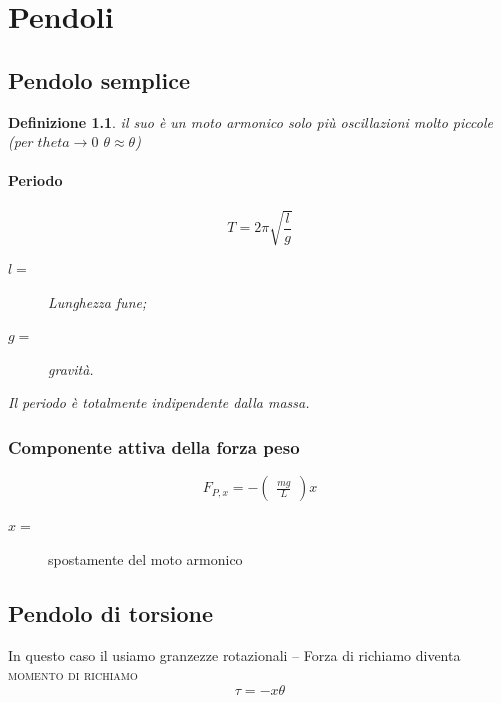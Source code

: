 \documentclass{book}
\newtheorem{defi}{Definizione}[section]
\begin{document}
\chapter{Pendoli}
\label{chap:pendoli}

\section{Pendolo semplice}
\label{sec:pensem}

\begin{defi}
  il suo è un moto armonico solo più oscillazioni molto piccole (per $theta\to 0$ $\theta\approx\theta$)
  \subsubsection{Periodo}
  \label{sec:perpensem}
  \begin{equation}
    \label{eq:pensem}
    T=2\pi\sqrt{\frac{l}{g}}
  \end{equation}
  \begin{description}
  \item[$l=$] Lunghezza fune;
  \item[$g=$] gravità.
  \end{description}
  Il periodo è totalmente indipendente dalla massa.
\end{defi}

\subsection{Componente attiva della forza peso}
\label{sec:componenteattdelforzapeso}

\begin{equation}
  \label{eq:componenteattdelforzapeso}
  F_{P,x}=-
  \begin{pmatrix}
    \frac{mg}{L}
  \end{pmatrix}x
\end{equation}
\begin{description}
\item[$x=$] spostamente del moto armonico
\end{description}
\section{Pendolo di torsione}
\label{sec:penditors}

In questo caso il usiamo granzezze rotazionali -- Forza di richiamo diventa \textsc{momento di richiamo}
\begin{equation}
  \label{eq:momedirich}
  \tau=-x\theta
\end{equation}
\end{document}
